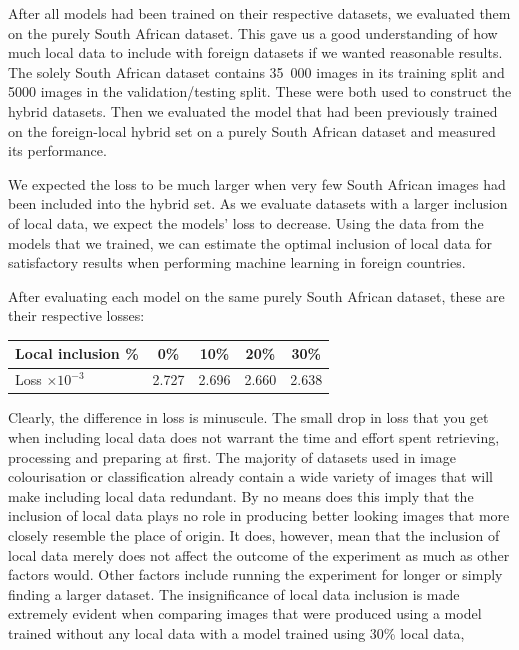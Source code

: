 \documentclass[conference]{IEEEtran}
\begin{document}
After all models had been trained on their respective datasets, we evaluated them on the purely South African dataset. This gave us a good understanding of how much local data to include with foreign datasets if we wanted reasonable results. The solely South African dataset contains 35~000 images in its training split and 5000 images in the validation/testing split. These were both used to construct the hybrid datasets. Then we evaluated the model that had been previously trained on the foreign-local hybrid set on a purely South African dataset and measured its performance.

We expected the loss to be much larger when very few South African images had been included into the hybrid set. As we evaluate datasets with a larger inclusion of local data, we expect the models' loss to decrease. Using the data from the models that we trained, we can estimate the optimal inclusion of local data for satisfactory results when performing machine learning in foreign countries.

After evaluating each model on the same purely South African dataset, these are their respective losses:

\begin{table}[h]
\centering
\renewcommand{\arraystretch}{1.5}
\begin{tabular}{|l||c|c|c|c|}
\hline 
Local inclusion \% & 0\% & 10\% & 20\% & 30\%  \\
\hline
Loss $\times 10^{-3}$& 2.727 & 2.696 & 2.660 & 2.638\\ 
\hline 
\end{tabular} 
\end{table}



Clearly, the difference in loss is minuscule. The small drop in loss that you get when including local data does not warrant the time and effort spent retrieving, processing and preparing at first. The majority of datasets used in image colourisation or classification already contain a wide variety of images that will make including local data redundant. By no means does this imply that the inclusion of local data plays no role in producing better looking images that more closely resemble the place of origin. It does, however, mean that the inclusion of local data merely does not affect the outcome of the experiment as much as other factors would. Other factors include running the experiment for longer or simply finding a larger dataset. The insignificance of local data inclusion is made extremely evident when comparing images that were produced using a model trained without any local data with a model trained using 30\% local data,
\end{document}
